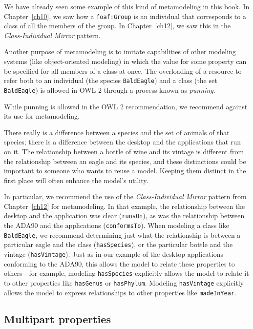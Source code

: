 We have already seen some example of this kind of metamodeling in this
book. In Chapter~\ref{ch10}, we saw how a \texttt{foaf:Group} is an individual that
corresponds to a class of all the members of the group. In Chapter~\ref{ch12},
we saw this in the \emph{Class-Individual Mirror} pattern.

Another purpose of metamodeling is to imitate capabilities of other
modeling systems (like object-oriented modeling) in which the value for
some property can be specified for all members of a class at once. The
overloading of a resource to refer both to an individual (the species
\texttt{BaldEagle}) and a class (the set \texttt{BaldEagle}) is allowed in OWL 2 through a
process known as \emph{punning}.

While punning is allowed in the OWL 2 recommendation, we recommend against its
use for metamodeling.

There really is a difference between a species and the set of animals of
that species; there is a difference between the desktop and the
applications that run on it. The relationship between a bottle of wine
and its vintage is different from the relationship between an eagle and
its species, and these distinctions could be important to someone who
wants to reuse a model. Keeping them distinct in the first place will
often enhance the model's utility.

In particular, we recommend the use of the \emph{Class-Individual Mirror}
pattern from Chapter~\ref{ch12} for metamodeling. In that example, the
relationship between the desktop and the application was clear (\texttt{runsOn}),
as was the relationship between the ADA90 and the applications
(\texttt{conformsTo}). When modeling a class like \texttt{BaldEagle}, we recommend
determining just what the relationship is between a particular eagle and
the class (\texttt{hasSpecies}), or the particular bottle and the vintage
(\texttt{hasVintage}). Just as in our example of the desktop applications
conforming to the ADA90, this allows the model to relate these
properties to others---for example, modeling \texttt{hasSpecies} explicitly
allows the model to relate it to other properties like \texttt{hasGenus} or
\texttt{hasPhylum}. Modeling \texttt{hasVintage} explicitly allows the model to express
relationships to other properties like \texttt{madeInYear}.

\subsection{Multipart properties}

